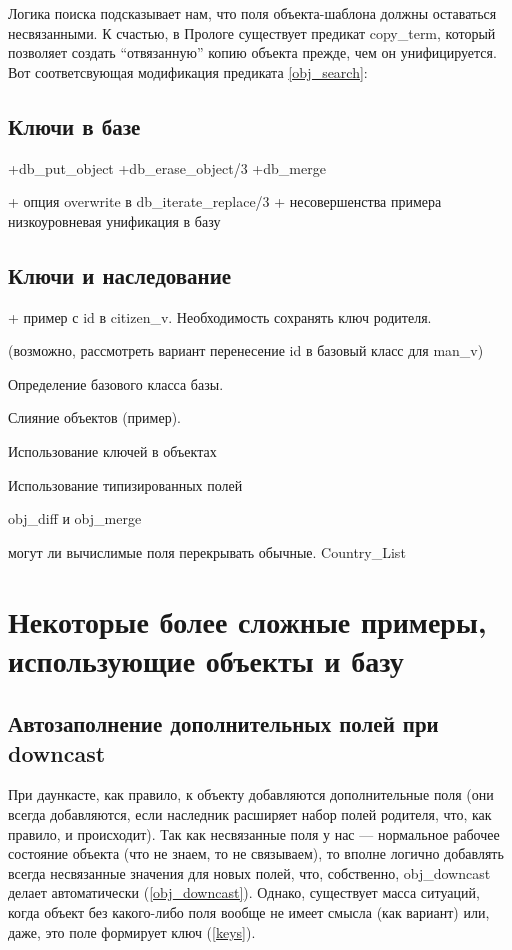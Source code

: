\documentclass[a4paper]{book}
\begin{document}
Логика поиска подсказывает нам, что поля объекта-шаблона должны
оставаться несвязанными. К счастью, в Прологе существует предикат
copy_term, который позволяет создать ``отвязанную'' копию объекта
прежде, чем он унифицируется. Вот соответсвующая модификация
предиката \ref{obj_search}:

\begin{example}{}{}
\end{example}




\subsection{Ключи в базе}

+db_put_object
+db_erase_object/3
+db_merge

+ опция overwrite в db_iterate_replace/3 + несовершенства примера
низкоуровневая унификация в базу


\subsection{Ключи и наследование}
\label{keys_inheritance}

+ пример с id в citizen_v. Необходимость сохранять ключ родителя.

(возможно, рассмотреть вариант перенесение id в базовый класс для
man_v)

Определение базового класса базы.

Слияние объектов (пример).


Использование ключей в объектах

Использование типизированных полей

obj\_diff и obj\_merge

могут ли вычислимые поля перекрывать обычные. Country\_List

\section{Некоторые более сложные примеры, использующие объекты и
  базу}

\subsection{Автозаполнение дополнительных полей при downcast}

При даункасте, как правило, к объекту добавляются дополнительные
поля (они всегда добавляются, если наследник расширяет набор
полей родителя, что, как правило, и происходит). Так как
несвязанные поля у нас --- нормальное рабочее состояние объекта
(что не знаем, то не связываем), то вполне логично добавлять
всегда несвязанные значения для новых полей, что, собственно,
obj_downcast делает автоматически (\ref{obj_downcast}). Однако,
существует масса ситуаций, когда объект без какого-либо поля
вообще не имеет смысла (как вариант) или, даже, это поле
формирует ключ (\ref{keys}).
\end{document}
